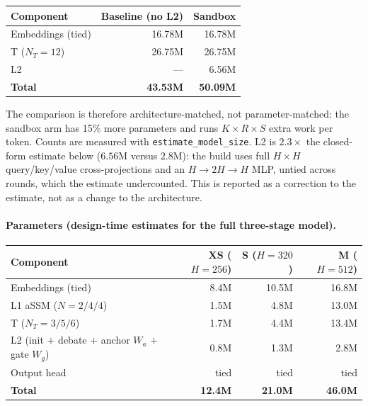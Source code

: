 \documentclass[11pt,a4paper]{article}
\theoremstyle{plain}
\theoremstyle{definition}
\theoremstyle{remark}
\begin{document}
\begin{center}
\small
\begin{tabular}{@{}lrr@{}}
\toprule
\rowcolor{ekHeadBG}\color{white}\textbf{Component} & \color{white}\textbf{Baseline (no L2)} & \color{white}\textbf{Sandbox} \\
\midrule
\rowcolor{ekEdge!12}Embeddings (tied) & 16.78M & 16.78M \\
\rowcolor{ekRowT}T ($N_T{=}12$) & 26.75M & 26.75M \\
\rowcolor{ekRow2}L2 & --- & 6.56M \\
\midrule
\rowcolor{ekEdge!25}\textbf{Total} & \textbf{43.53M} & \textbf{50.09M} \\
\bottomrule
\end{tabular}
\end{center}

\noindent
The comparison is therefore architecture-matched, not parameter-matched: the
sandbox arm has 15\% more parameters and runs $K{\times}R{\times}S$ extra
work per token. Counts are measured with \texttt{estimate\_model\_size}. L2 is
$2.3\times$ the closed-form estimate below ($6.56$M versus $2.8$M): the build
uses full $H{\times}H$ query/key/value cross-projections and an
$H\to2H\to H$ MLP, untied across rounds, which the estimate undercounted.
This is reported as a correction to the estimate, not as a change to the
architecture.

\paragraph{Parameters (design-time estimates for the full three-stage model).}

\begin{center}
\small
\begin{tabular}{@{}lrrr@{}}
\toprule
\rowcolor{ekHeadBG}\color{white}\textbf{Component} & \color{white}\textbf{XS ($H{=}256$)} & \color{white}\textbf{S ($H{=}320$)} & \color{white}\textbf{M ($H{=}512$)} \\
\midrule
\rowcolor{ekEdge!12}Embeddings (tied) & 8.4M & 10.5M & 16.8M \\
\rowcolor{ekRowL}L1 aSSM ($N{=}2/4/4$) & 1.5M & 4.8M & 13.0M \\
\rowcolor{ekRowT}T ($N_T{=}3/5/6$) & 1.7M & 4.4M & 13.4M \\
\rowcolor{ekRow2}L2 (init $+$ debate $+$ anchor $W_a$ $+$ gate $W_g$) & 0.8M & 1.3M & 2.8M \\
\rowcolor{ekEdge!12}Output head & tied & tied & tied \\
\midrule
\rowcolor{ekEdge!25}\textbf{Total} & \textbf{12.4M} & \textbf{21.0M} & \textbf{46.0M} \\
\bottomrule
\end{tabular}
\end{center}
\end{document}
